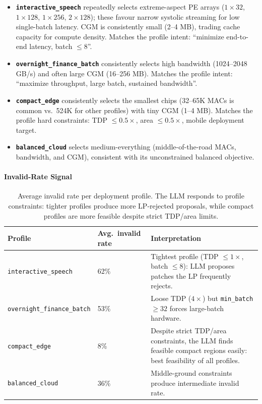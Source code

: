 \begin{itemize}[leftmargin=1.4em, itemsep=3pt]

    \item \textbf{\texttt{interactive\_speech}} repeatedly selects
          extreme-aspect PE arrays ($1{\times}32$, $1{\times}128$,
          $1{\times}256$, $2{\times}128$); these favour narrow systolic
          streaming for low single-batch latency. CGM is consistently
          small (2–4 MB), trading cache capacity for compute density.
          Matches the profile intent: ``minimize end-to-end latency,
          batch $\leq 8$''.

    \item \textbf{\texttt{overnight\_finance\_batch}} consistently
          selects high bandwidth (1024–2048 GB/s) and often large CGM
          (16–256 MB). Matches the profile intent: ``maximize throughput,
          large batch, sustained bandwidth''.

    \item \textbf{\texttt{compact\_edge}} consistently selects the
          smallest chips (32–65K MACs is common vs.\ 524K for other
          profiles) with tiny CGM (1–4 MB). Matches the profile
          hard constraints: TDP $\leq 0.5\times$, area $\leq 0.5\times$,
          mobile deployment target.

    \item \textbf{\texttt{balanced\_cloud}} selects medium-everything
          (middle-of-the-road MACs, bandwidth, and CGM), consistent
          with its unconstrained balanced objective.

\end{itemize}

\paragraph{Invalid-Rate Signal}

\begin{table}[h]
\centering
\caption{Average invalid rate per deployment profile. The LLM responds
to profile constraints: tighter profiles produce more LP-rejected
proposals, while compact profiles are more feasible despite strict
TDP/area limits.}
\label{tab:profile_invalid_rates}
\begin{tabular}{llp{8cm}}
\toprule
\textbf{Profile} & \textbf{Avg.\ invalid rate} & \textbf{Interpretation} \\
\midrule
\texttt{interactive\_speech}       & 62\% &
Tightest profile (TDP $\leq 1\times$, batch $\leq 8$): LLM proposes
patches the LP frequently rejects. \\
\texttt{overnight\_finance\_batch} & 53\% &
Loose TDP ($4\times$) but \texttt{min\_batch} $\geq 32$ forces
large-batch hardware. \\
\texttt{compact\_edge}             &  8\% &
Despite strict TDP/area constraints, the LLM finds feasible compact
regions easily: best feasibility of all profiles. \\
\texttt{balanced\_cloud}           & 36\% &
Middle-ground constraints produce intermediate invalid rate. \\
\bottomrule
\end{tabular}
\end{table}


